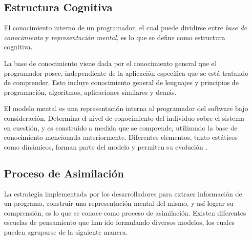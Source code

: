 \subsection{Estructura Cognitiva}
El conocimiento interno de un programador, el cual puede dividirse entre \textit{base de conocimiento}
y \textit{representación mental}, es lo que se define como estructura cognitiva.

La base de conocimiento viene dada por el conocimiento general que el programador posee,
independiente de la aplicación específica que se está tratando de comprender.
Esto incluye conocimiento general de lenguajes y principios de programación, algoritmos, 
aplicaciones similares y demás.

El modelo mental es una representación interna al programador del software bajo consideración.
Determina el nivel de conocimiento del individuo sobre el sistema en cuestión, y es construido
a medida que se comprende, utilizando la base de conocimiento mencionada anteriormente.
Diferentes elementos, tanto estáticos como dinámicos, forman parte del modelo y permiten
su evolución \cite{MayrhauserVans95}.

\subsection{Proceso de Asimilación}
La estrategia implementada por los desarrolladores para extraer información de un programa, 
construir una representación mental del mismo, y así lograr su comprensión, es lo que se
conoce como proceso de asimilación.
Existen diferentes escuelas de pensamiento que han ido formulando diversos modelos, los
cuales pueden agruparse de la siguiente manera.

